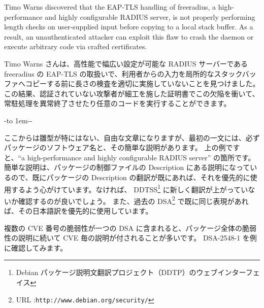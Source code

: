 \documentclass[mingoth,a4paper]{jsarticle}
\begin{document}



\parbox[t]{0.47\linewidth}{
Timo Warns discovered that the EAP-TLS handling of freeradius, a high-performance and highly configurable RADIUS server, is not properly performing length checks on user-supplied input before copying to a local stack buffer.  As a result, an unauthenticated attacker can exploit this flaw to crash the daemon or execute arbitrary code via crafted certificates.
}\hfil
\parbox[t]{0.47\linewidth}{
Timo Warns さんは、高性能で幅広い設定が可能な RADIUS サーバーである freeradius の EAP-TLS の取扱いで、利用者からの入力を局所的なスタックバッファへコピーする前に長さの検査を適切に実施していないことを見つけました。この結果、認証されていない攻撃者が細工を施した証明書でこの欠陥を衝いて、常駐処理を異常終了させたり任意のコードを実行することができます。
}\hfil

-\leaders\hbox to 1em{\hss{}-\hss}\hfill -\par

\vspace{1em}\par

ここからは雛型が特にはない、自由な文章になりますが、最初の一文には、必ずパッケージのソフトウェア名と、その簡単な説明があります。
上の例ですと、``a high-performance and highly configurable RADIUS server'' の箇所です。
簡単な説明は、パッケージの制御ファイルの Description にある説明になっているので、既にパッケージの Description の翻訳が既にあれば、それを優先的に使用するよう心がけています。なければ、 DDTSS\footnote{Debian パッケージ説明文翻訳プロジェクト（DDTP）のウェブインターフェイス} に新しく翻訳が上がっていないか確認するのが良いでしょう。
また、過去の DSA\footnote{URL :\tt http://www.debian.org/security/} で既に同じ表現があれば、その日本語訳を優先的に使用しています。


複数の CVE 番号の脆弱性が一つの DSA に含まれると、パッケージ全体の脆弱性の説明に続いて CVE 毎の説明が付されることが多いです。 DSA-2548-1 を例に確認してみます。
\end{document}

